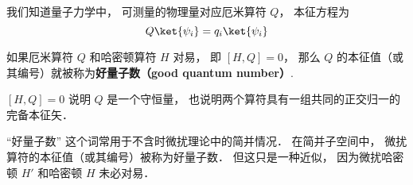 
\begin{issues}
\end{issues}


我们知道量子力学中， 可测量的物理量对应厄米算符 $Q$， 本征方程为
\begin{equation}\label{GoodQN_eq1}
Q \ket{\psi_i} = q_i \ket{\psi_i}
\end{equation}

\begin{definition}{}
如果厄米算符 $Q$ 和哈密顿算符 $H$ 对易， 即 $[H, Q] = 0$， 那么 $Q$ 的本征值（或其编号）就被称为\textbf{好量子数（good quantum number）}.
\end{definition}

$[H, Q] = 0$ 说明 $Q$ 是一个守恒量， 也说明两个算符具有一组共同的正交归一的完备本征矢．

“好量子数” 这个词常用于不含时微扰理论中的简并情况． 在简并子空间中， 微扰算符的本征值（或其编号）被称为好量子数． 但这只是一种近似， 因为微扰哈密顿 $H'$ 和哈密顿 $H$ 未必对易．
